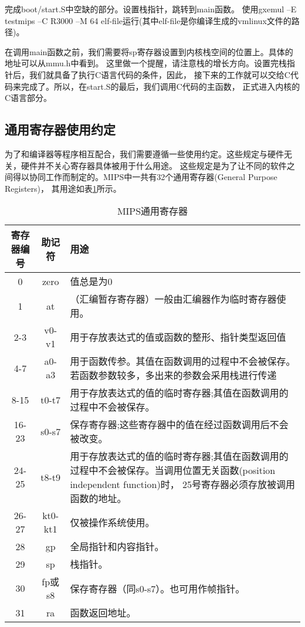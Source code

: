\begin{exercise}
完成boot/start.S中空缺的部分。设置栈指针，跳转到main函数。
使用gxemul –E testmips –C R3000 –M 64 elf-file运行(其中elf-file是你编译生成的vmlinux文件的路径)。 
\end{exercise}

在调用main函数之前，我们需要将sp寄存器设置到内核栈空间的位置上。具体的地址可以从mmu.h中看到。
这里做一个提醒，请注意栈的增长方向。设置完栈指针后，我们就具备了执行C语言代码的条件，因此，
接下来的工作就可以交给C代码来完成了。所以，在start.S的最后，我们调用C代码的主函数，
正式进入内核的C语言部分。

\subsection{通用寄存器使用约定}
为了和编译器等程序相互配合，我们需要遵循一些使用约定。这些规定与硬件无关，硬件并不关心寄存器具体被用于什么用途。
这些规定是为了让不同的软件之间得以协同工作而制定的。MIPS中一共有32个通用寄存器(General Purpose Registers)，
其用途如表\ref{tab:registers}所示。

\begin{table}[h]
  \centering
  \begin{tabular}{ccp{10cm}}
    \toprule
    寄存器编号 & 助记符 & 用途 \\
    \midrule
    0   & zero & 值总是为0\\
    1   & at   & （汇编暂存寄存器）一般由汇编器作为临时寄存器使用。\\
    2-3 & v0-v1& 用于存放表达式的值或函数的整形、指针类型返回值\\
    4-7 & a0-a3& 用于函数传参。其值在函数调用的过程中不会被保存。若函数参数较多，多出来的参数会采用栈进行传递\\
    8-15& t0-t7& 用于存放表达式的值的临时寄存器;其值在函数调用的过程中不会被保存。\\
    16-23&s0-s7& 保存寄存器;这些寄存器中的值在经过函数调用后不会被改变。\\
    24-25&t8-t9& 用于存放表达式的值的临时寄存器;其值在函数调用的过程中不会被保存。当调用位置无关函数(position independent function)时，
               25号寄存器必须存放被调用函数的地址。\\
    26-27&kt0-kt1& 仅被操作系统使用。\\
    28  & gp   & 全局指针和内容指针。\\
    29  & sp   & 栈指针。\\
    30  &fp或s8& 保存寄存器（同s0-s7）。也可用作帧指针。\\
    31  & ra   & 函数返回地址。\\
    \bottomrule
  \end{tabular}
  \caption{MIPS通用寄存器\label{tab:registers}}
\end{table}

